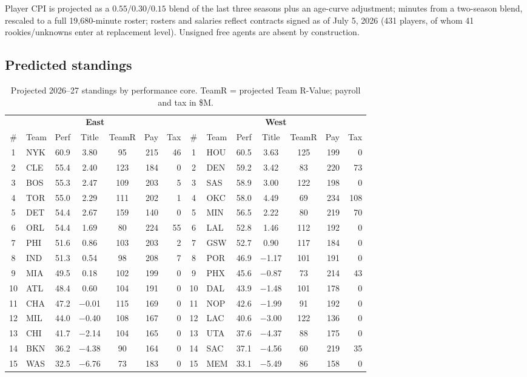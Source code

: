 \documentclass[11pt]{article}
\begin{document}
Player CPI is projected as a $0.55/0.30/0.15$ blend of the last three seasons
plus an age-curve adjustment; minutes from a two-season blend, rescaled to a
full 19{,}680-minute roster; rosters and salaries reflect contracts signed as
of July 5, 2026 (431 players, of whom 41 rookies/unknowns enter at replacement
level). Unsigned free agents are absent by construction.

\subsection{Predicted standings}

\begin{table}[h]\centering
\caption{Projected 2026--27 standings by performance core. TeamR = projected
Team R-Value; payroll and tax in \$M.}
\scriptsize
\begin{tabular}{clcccrr@{\hspace{16pt}}clcccrr}
\toprule
\multicolumn{7}{c}{\textbf{East}} & \multicolumn{7}{c}{\textbf{West}} \\
\cmidrule(r{16pt}){1-7}\cmidrule{8-14}
\# & Team & Perf & Title & TeamR & Pay & Tax &
\# & Team & Perf & Title & TeamR & Pay & Tax \\
\midrule
1  & NYK & 60.9 & 3.80  & 95  & 215 & 46 & 1  & HOU & 60.5 & 3.63  & 125 & 199 & 0   \\
2  & CLE & 55.4 & 2.40  & 123 & 184 & 0  & 2  & DEN & 59.2 & 3.42  & 83  & 220 & 73  \\
3  & BOS & 55.3 & 2.47  & 109 & 203 & 5  & 3  & SAS & 58.9 & 3.00  & 122 & 198 & 0   \\
4  & TOR & 55.0 & 2.29  & 111 & 202 & 1  & 4  & OKC & 58.0 & 4.49  & 69  & 234 & 108 \\
5  & DET & 54.4 & 2.67  & 159 & 140 & 0  & 5  & MIN & 56.5 & 2.22  & 80  & 219 & 70  \\
6  & ORL & 54.4 & 1.69  & 80  & 224 & 55 & 6  & LAL & 52.8 & 1.46  & 112 & 192 & 0   \\
7  & PHI & 51.6 & 0.86  & 103 & 203 & 2  & 7  & GSW & 52.7 & 0.90  & 117 & 184 & 0   \\
8  & IND & 51.3 & 0.54  & 98  & 208 & 7  & 8  & POR & 46.9 & $-$1.17 & 101 & 191 & 0 \\
9  & MIA & 49.5 & 0.18  & 102 & 199 & 0  & 9  & PHX & 45.6 & $-$0.87 & 73  & 214 & 43 \\
10 & ATL & 48.4 & 0.60  & 104 & 191 & 0  & 10 & DAL & 43.9 & $-$1.48 & 101 & 178 & 0  \\
11 & CHA & 47.2 & $-$0.01 & 115 & 169 & 0 & 11 & NOP & 42.6 & $-$1.99 & 91  & 192 & 0 \\
12 & MIL & 44.0 & $-$0.40 & 108 & 167 & 0 & 12 & LAC & 40.6 & $-$3.00 & 122 & 136 & 0 \\
13 & CHI & 41.7 & $-$2.14 & 104 & 165 & 0 & 13 & UTA & 37.6 & $-$4.37 & 88  & 175 & 0 \\
14 & BKN & 36.2 & $-$4.38 & 90  & 164 & 0 & 14 & SAC & 37.1 & $-$4.56 & 60  & 219 & 35 \\
15 & WAS & 32.5 & $-$6.76 & 73  & 183 & 0 & 15 & MEM & 33.1 & $-$5.49 & 86  & 158 & 0  \\
\bottomrule
\end{tabular}
\end{table}
\end{document}
